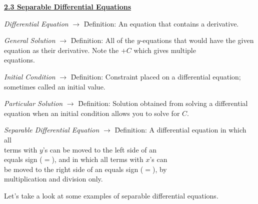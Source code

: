 \textbf{\underline{\large{2.3 Separable Differential Equations}}} \par

\begin{tcolorbox}[definition]
    \begin{tabbing}
        \textit{Differential Equation} $\rightarrow$ \= Definition: An equation that contains a derivative. 
    \end{tabbing} \vspace{11pt}
    \begin{tabbing}
        \textit{General Solution} $\rightarrow$ \= Definition: All of the $y$-equations that would have the given \\
        \> equation as their derivative. Note the $+C$ which gives multiple \\
        \> equations.
    \end{tabbing} \vspace{11pt}
    \begin{tabbing}
        \textit{Initial Condition} $\rightarrow$ \= Definition: Constraint placed on a differential equation; \\
        \> sometimes called an initial value. 
    \end{tabbing} \vspace{11pt}
    \begin{tabbing}
        \textit{Particular Solution} $\rightarrow$ \= Definition: Solution obtained from solving a differential \\
        \> equation when an initial condition allows you to solve for $C$.
    \end{tabbing} \vspace{11pt}
    \begin{tabbing}
        \textit{Separable Differential Equation} $\rightarrow$ \= Definition: A differential equation in which all \\
        \> terms with $y$'s can be moved to the left side of an \\
        \> equals sign ($=$), and in which all terms with $x$'s can \\
        \> be moved to the right side of an equals sign ($=$), by \\
        \> multiplication and division only.
    \end{tabbing}
\end{tcolorbox}

Let's take a look at some examples of separable differential equations.

